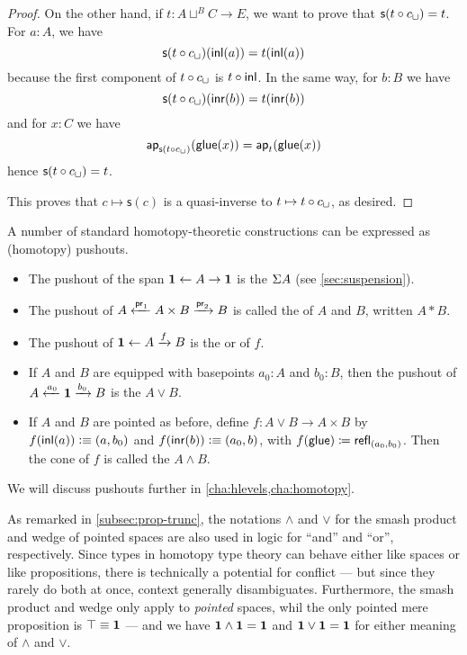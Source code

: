 \begin{proof}
On the other hand, if $t:A\sqcup^BC\to{}E$, we want to prove that
$\mathsf{s}(t\circ c_\sqcup)=t$.
For $a:A$, we have
\[\mathsf{s}(t\circ c_\sqcup)({\mathsf{inl}}(a))=t({\mathsf{inl}}(a))\]
because the first component of $t\circ c_\sqcup$ is $t\circ{\mathsf{inl}}$. In
the same way, for $b:B$ we have
\[\mathsf{s}(t\circ c_\sqcup)({\mathsf{inr}}(b))=t({\mathsf{inr}}(b))\]
and for $x:C$ we have
\[\mathsf{ap}_{\mathsf{s}(t\circ c_\sqcup)}(\mathsf{glue}(x))
=\mathsf{ap}_{t}(\mathsf{glue}(x))\]
hence $\mathsf{s}(t\circ c_\sqcup)=t$.

This proves that $c\mapsto\mathsf{s}(c)$ is a quasi-inverse to $t\mapsto{}t\circ c_\sqcup$, as desired.
\end{proof}

A number of standard homotopy-theoretic constructions can be expressed as (homotopy) pushouts.
\begin{itemize}
\item The pushout of the span $\mathbf{1} \leftarrow A \to \mathbf{1}$ is the  $\Sigma A$ (see \autoref{sec:suspension}).%
\item The pushout of $A \xleftarrow{\mathsf{pr}_{1}} A\times B \xrightarrow{\mathsf{pr}_{2}} B$ is called the  of $A$ and $B$, written $A*B$.%
\item The pushout of $\mathbf{1} \leftarrow A \xrightarrow{f} B$ is the  or  of $f$.%
\item If $A$ and $B$ are equipped with basepoints $a_0:A$ and $b_0:B$, then the pushout of $A \xleftarrow{a_0} \mathbf{1} \xrightarrow{b_0} B$ is the  $A\vee B$.%
\item If $A$ and $B$ are pointed as before, define $f:A\vee B \to A\times B$ by $f({\mathsf{inl}}(a))\vcentcolon\equiv (a,b_0)$ and $f({\mathsf{inr}}(b))\vcentcolon\equiv (a_0,b)$, with ${f}\mathopen{}\left({\mathsf{glue}}\right)\mathclose{} \coloneqq \mathsf{refl}_{(a_0,b_0)}$.
  Then the cone of $f$ is called the  $A\wedge B$.%
\end{itemize}
We will discuss pushouts further in \autoref{cha:hlevels,cha:homotopy}.

\begin{rmk}
  As remarked in \autoref{subsec:prop-trunc}, the notations $\wedge$ and $\vee$ for the smash product and wedge of pointed spaces are also used in logic for ``and'' and ``or'', respectively.
  Since types in homotopy type theory can behave either like spaces or like propositions, there is technically a potential for conflict --- but since they rarely do both at once, context generally disambiguates.
  Furthermore, the smash product and wedge only apply to \emph{pointed} spaces, whil the only pointed mere proposition is $\top\equiv\mathbf{1}$ --- and we have $\mathbf{1}\wedge \mathbf{1} = \mathbf{1}$ and $\mathbf{1}\vee\mathbf{1}=\mathbf{1}$ for either meaning of $\wedge$ and $\vee$.
\end{rmk}

